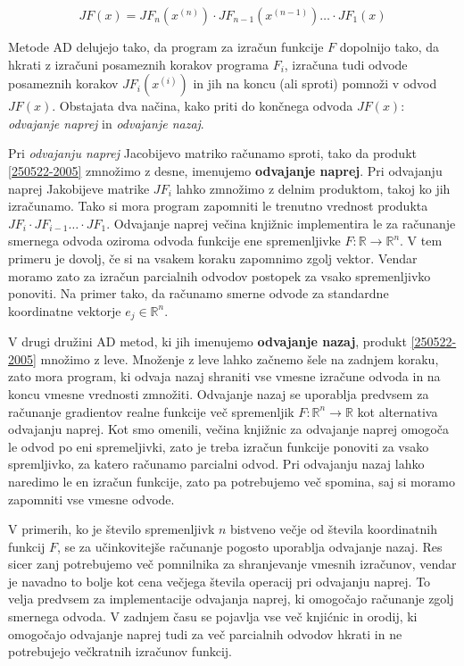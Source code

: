 \documentclass[12pt,slovene]{article}
\newcommand{\RR}{\mathbb R}
\begin{document}
    \begin{equation}\label{250522-2005}
        JF(x) = JF_n(x^{(n)})\cdot JF_{n-1}(x^{(n-1)})\ldots\cdot JF_1(x)
    \end{equation}
  
Metode AD delujejo tako, da program za izračun funkcije $F$ dopolnijo tako, da hkrati z izračuni posameznih korakov programa $F_i$, izračuna tudi odvode posameznih korakov $JF_{i}(x^{(i)})$ in jih na koncu (ali sproti) pomnoži v odvod $JF(x)$. Obstajata dva načina, kako priti do končnega odvoda $JF(x)$: \emph{odvajanje naprej} in \emph{odvajanje nazaj}.

Pri \emph{odvajanju naprej} Jacobijevo matriko računamo sproti, tako da produkt \eqref{250522-2005} zmnožimo z desne, imenujemo \textbf{odvajanje naprej}. Pri odvajanju naprej Jakobijeve matrike $JF_i$ lahko zmnožimo z delnim produktom, takoj ko jih izračunamo. Tako si mora program zapomniti le trenutno vrednost produkta $JF_i\cdot JF_{i-1}\ldots \cdot JF_1$.
Odvajanje naprej večina knjižnic implementira le za računanje smernega odvoda oziroma odvoda funkcije ene spremenljivke $F:\RR\to\RR^n$. V tem primeru je dovolj, če si na vsakem koraku zapomnimo zgolj vektor. Vendar moramo zato za izračun parcialnih odvodov postopek za vsako spremenljivko ponoviti. Na primer tako, da računamo smerne odvode za standardne koordinatne vektorje $e_j\in \RR^n$. 

V drugi družini AD metod, ki jih imenujemo \textbf{odvajanje nazaj}, produkt \eqref{250522-2005} množimo z leve. Množenje z leve lahko začnemo šele na zadnjem koraku, zato mora program, ki odvaja nazaj shraniti vse vmesne izračune odvoda in na koncu vmesne vrednosti zmnožiti. Odvajanje nazaj se uporablja predvsem za računanje gradientov realne funkcije več spremenljik $F:\RR^n \to \RR$ kot alternativa odvajanju naprej. Kot smo omenili, večina knjižnic za odvajanje naprej omogoča le odvod po eni spremeljivki, zato je treba izračun funkcije ponoviti za vsako spremljivko, za katero računamo parcialni odvod. Pri odvajanju nazaj lahko naredimo le en izračun funkcije, zato pa potrebujemo več spomina, saj si moramo zapomniti vse vmesne odvode.

V primerih, ko je število spremenljivk $n$ bistveno večje od števila koordinatnih funkcij $F$, se za učinkovitejše računanje pogosto uporablja odvajanje nazaj. Res sicer zanj potrebujemo več pomnilnika za shranjevanje vmesnih izračunov, vendar je navadno to bolje kot cena večjega števila operacij pri odvajanju naprej. To velja predvsem za implementacije odvajanja naprej, ki omogočajo računanje zgolj smernega odvoda. V zadnjem času se pojavlja vse več knjićnic in orodij, ki omogočajo odvajanje naprej tudi za več parcialnih odvodov hkrati in ne potrebujejo večkratnih izračunov funkcij.
\end{document}

